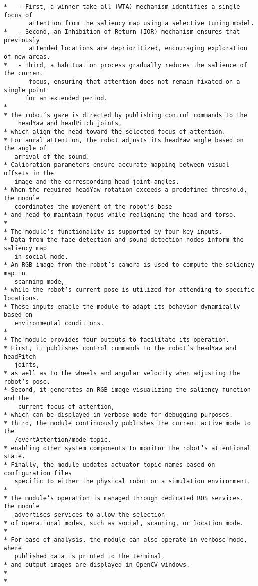 \documentclass{CSSRforAfrica}
\begin{document}
\begin{description}
{\begin{verbatim}
*   - First, a winner-take-all (WTA) mechanism identifies a single focus of 
       attention from the saliency map using a selective tuning model. 
*   - Second, an Inhibition-of-Return (IOR) mechanism ensures that previously 
       attended locations are deprioritized, encouraging exploration of new areas. 
*   - Third, a habituation process gradually reduces the salience of the current 
       focus, ensuring that attention does not remain fixated on a single point 
      for an extended period.
*
* The robot’s gaze is directed by publishing control commands to the 
    headYaw and headPitch joints, 
* which align the head toward the selected focus of attention. 
* For aural attention, the robot adjusts its headYaw angle based on the angle of 
   arrival of the sound. 
* Calibration parameters ensure accurate mapping between visual offsets in the 
   image and the corresponding head joint angles. 
* When the required headYaw rotation exceeds a predefined threshold, the module 
   coordinates the movement of the robot’s base 
* and head to maintain focus while realigning the head and torso.
*
* The module’s functionality is supported by four key inputs. 
* Data from the face detection and sound detection nodes inform the saliency map 
   in social mode. 
* An RGB image from the robot’s camera is used to compute the saliency map in 
   scanning mode, 
* while the robot’s current pose is utilized for attending to specific locations. 
* These inputs enable the module to adapt its behavior dynamically based on 
   environmental conditions.
*
* The module provides four outputs to facilitate its operation. 
* First, it publishes control commands to the robot’s headYaw and headPitch 
   joints, 
* as well as to the wheels and angular velocity when adjusting the robot’s pose. 
* Second, it generates an RGB image visualizing the saliency function and the 
    current focus of attention, 
* which can be displayed in verbose mode for debugging purposes. 
* Third, the module continuously publishes the current active mode to the 
   /overtAttention/mode topic, 
* enabling other system components to monitor the robot’s attentional state. 
* Finally, the module updates actuator topic names based on configuration files 
   specific to either the physical robot or a simulation environment.
*
* The module’s operation is managed through dedicated ROS services. The module 
   advertises services to allow the selection 
* of operational modes, such as social, scanning, or location mode. 
*
* For ease of analysis, the module can also operate in verbose mode, where 
   published data is printed to the terminal, 
* and output images are displayed in OpenCV windows.
*
*
\end{verbatim}}


\end{description}
\end{document}
